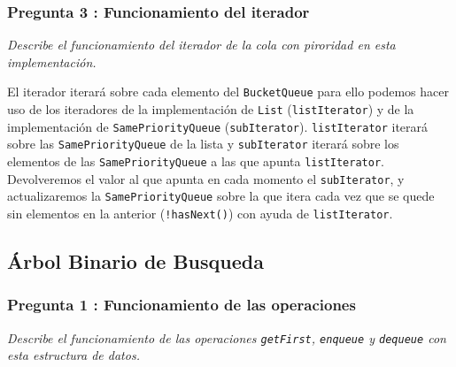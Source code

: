 \documentclass[a4paper, 12pt]{article}
\begin{document}
            \subsubsection{Pregunta 3 : Funcionamiento del iterador}

                \textit{Describe el funcionamiento del iterador de la cola con 
                piroridad en esta implementación.}\\\mbox{}

                El iterador iterará sobre cada elemento del \texttt{BucketQueue}
                para ello podemos hacer uso de los iteradores de la
                implementación de \texttt{List} (\texttt{listIterator}) y de la
                implementación de \texttt{SamePriorityQueue} 
                (\texttt{subIterator}). \texttt{listIterator} iterará sobre las
                \texttt{SamePriorityQueue} de la lista y \texttt{subIterator} 
                iterará sobre los elementos de las \texttt{SamePriorityQueue} a 
                las que apunta \texttt{listIterator}. Devolveremos el valor al 
                que apunta en cada momento el \texttt{subIterator}, y 
                actualizaremos la \texttt{SamePriorityQueue} sobre la que itera 
                cada vez que se quede sin elementos en la anterior 
                (\texttt{!hasNext()}) con ayuda de \texttt{listIterator}.

        \subsection{Árbol Binario de Busqueda}

            \subsubsection{Pregunta 1 : Funcionamiento de las operaciones}

                \textit{Describe el funcionamiento de las operaciones 
                \texttt{getFirst}, \texttt{enqueue} y \texttt{dequeue} con esta
                estructura de datos.}\\\mbox{}
\end{document}
